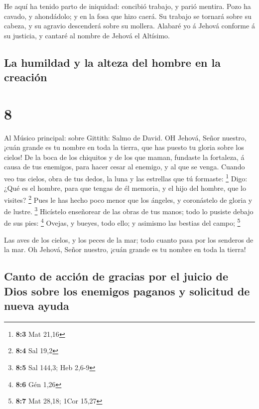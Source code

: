  He aquí ha tenido parto de iniquidad: concibió trabajo, y
parió mentira.  Pozo ha cavado, y ahondádolo; y en la fosa
que hizo caerá.  Su trabajo se tornará sobre su cabeza, y
su agravio descenderá sobre su mollera.  Alabaré yo á
Jehová conforme á su justicia, y cantaré al nombre de Jehová el
Altísimo.

\hypertarget{la-humildad-y-la-alteza-del-hombre-en-la-creaciuxf3n}{%
\subsection{La humildad y la alteza del hombre en la
creación}\label{la-humildad-y-la-alteza-del-hombre-en-la-creaciuxf3n}}

\hypertarget{section-7}{%
\section{8}\label{section-7}}

 Al Músico principal: sobre Gittith: Salmo de David. OH
Jehová, Señor nuestro, ¡cuán grande es tu nombre en toda la tierra, que
has puesto tu gloria sobre los cielos!  De la boca de los
chiquitos y de los que maman, fundaste la fortaleza, á causa de tus
enemigos, para hacer cesar al enemigo, y al que se venga. 
Cuando veo tus cielos, obra de tus dedos, la luna y las estrellas que tú
formaste: \footnote{\textbf{8:3} Mat 21,16}  Digo: ¿Qué es
el hombre, para que tengas de él memoria, y el hijo del hombre, que lo
visites? \footnote{\textbf{8:4} Sal 19,2}  Pues le has hecho
poco menor que los ángeles, y coronástelo de gloria y de lustre.
\footnote{\textbf{8:5} Sal 144,3; Heb 2,6-9}  Hicístelo
enseñorear de las obras de tus manos; todo lo pusiste debajo de sus
pies: \footnote{\textbf{8:6} Gén 1,26}  Ovejas, y bueyes,
todo ello; y asimismo las bestias del campo; \footnote{\textbf{8:7} Mat
  28,18; 1Cor 15,27}

 Las aves de los cielos, y los peces de la mar; todo cuanto
pasa por los senderos de la mar.  Oh Jehová, Señor nuestro,
¡cuán grande es tu nombre en toda la tierra!

\hypertarget{canto-de-acciuxf3n-de-gracias-por-el-juicio-de-dios-sobre-los-enemigos-paganos-y-solicitud-de-nueva-ayuda}{%
\subsection{Canto de acción de gracias por el juicio de Dios sobre los
enemigos paganos y solicitud de nueva
ayuda}\label{canto-de-acciuxf3n-de-gracias-por-el-juicio-de-dios-sobre-los-enemigos-paganos-y-solicitud-de-nueva-ayuda}}

